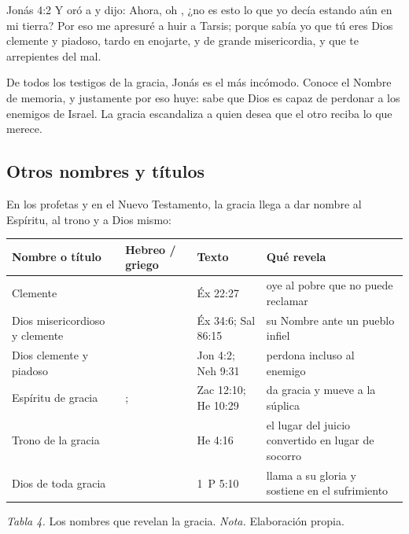 \begin{verso}{Jonás 4:2}
Y oró a \SENOR{} y dijo: Ahora, oh \SENOR, ¿no es esto lo que yo decía estando aún en mi tierra? Por eso me apresuré a huir a Tarsis; porque sabía yo que tú eres Dios clemente y piadoso, tardo en enojarte, y de grande misericordia, y que te arrepientes del mal.
\end{verso}

De todos los testigos de la gracia, Jonás es el más incómodo. Conoce el Nombre de memoria, y justamente por eso huye: sabe que Dios es capaz de perdonar a los enemigos de Israel. La gracia escandaliza a quien desea que el otro reciba lo que merece.

\subsection{Otros nombres y títulos}
En los profetas y en el Nuevo Testamento, la gracia llega a dar nombre al Espíritu, al trono y a Dios mismo:

\begin{center}\small\renewcommand{\arraystretch}{1.22}
\begin{tabular}{@{}L{3.2cm}L{3.6cm}L{2.6cm}L{5.0cm}@{}}
\toprule
\textbf{Nombre o título} & \textbf{Hebreo / griego} & \textbf{Texto} & \textbf{Qué revela} \\ \midrule
Clemente &  & Éx 22:27 & oye al pobre que no puede reclamar \\
Dios misericordioso y clemente &  & Éx 34:6; Sal 86:15 & su Nombre ante un pueblo infiel \\
Dios clemente y piadoso &  & Jon 4:2; Neh 9:31 & perdona incluso al enemigo \\
Espíritu de gracia & ;  & Zac 12:10; He 10:29 & da gracia y mueve a la súplica \\
Trono de la gracia &  & He 4:16 & el lugar del juicio convertido en lugar de socorro \\
Dios de toda gracia &  & 1~P 5:10 & llama a su gloria y sostiene en el sufrimiento \\
\bottomrule
\end{tabular}\par
{\footnotesize\color{gris}\textit{Tabla 4.} Los nombres que revelan la gracia. \textit{Nota.} Elaboración propia.}
\end{center}

